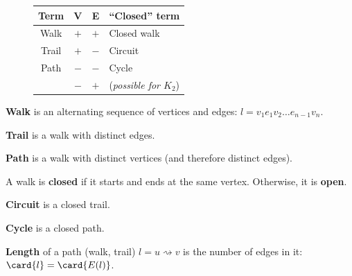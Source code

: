 \documentclass[a4paper,10pt]{article}
\begin{document}
\begin{terms}
    \begin{minipage}{\linewidth}

    \setlength{\intextsep}{0pt}%
    \begin{figure}
        \setlength{\tabcolsep}{4pt}%
        \begin{NiceTabular}{ cccl }
            \toprule \RowStyle{\bfseries}
            Term & V& E& \enquote{Closed} term \\
            \midrule
            Walk  & $+$ & $+$ & Closed walk \\
            Trail & $+$ & $-$ & Circuit \\
            Path  & $-$ & $-$ & Cycle \\
                  & $-$ & $+$ & (\emph{possible for $K_2$}) \\
            \bottomrule
        \end{NiceTabular}
    \end{figure}

    \item \textbf{Walk} is an alternating sequence of vertices and edges: $l = v_{1} e_{1} v_{2} \dots e_{n-1} v_{n}$.
    \begin{terms}
        \item \textbf{Trail} is a walk with distinct edges.
        \item \textbf{Path} is a walk with distinct vertices (and therefore distinct edges).
        \item A walk is \textbf{closed} if it starts and ends at the same vertex. Otherwise, it is \textbf{open}.
        \item \textbf{Circuit} is a closed trail.
        \item \textbf{Cycle} is a closed path.
    \end{terms}

    \end{minipage}

    \item \textbf{Length} of a path (walk, trail) $l = u \rightsquigarrow v$ is the number of edges in it: $\card{l} = \card{E(l)}$.


\end{terms}
\end{document}
